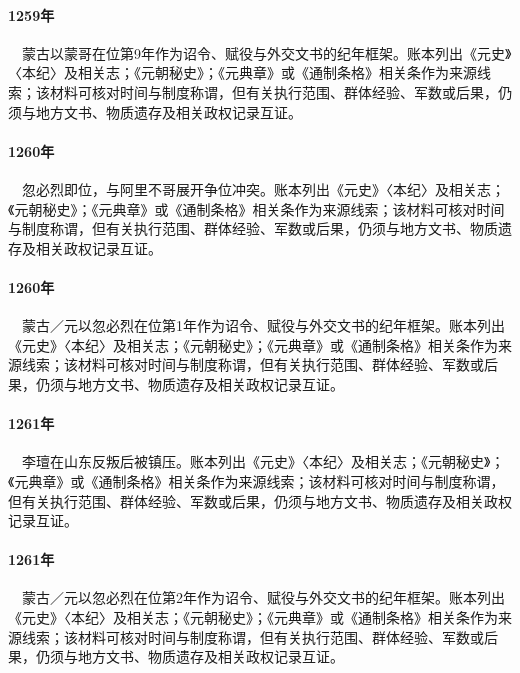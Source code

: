 \paragraph{1259年}　蒙古以蒙哥在位第9年作为诏令、赋役与外交文书的纪年框架。账本列出《元史》〈本纪〉及相关志；《元朝秘史》；《元典章》或《通制条格》相关条作为来源线索；该材料可核对时间与制度称谓，但有关执行范围、群体经验、军数或后果，仍须与地方文书、物质遗存及相关政权记录互证。

\paragraph{1260年}　忽必烈即位，与阿里不哥展开争位冲突。账本列出《元史》〈本纪〉及相关志；《元朝秘史》；《元典章》或《通制条格》相关条作为来源线索；该材料可核对时间与制度称谓，但有关执行范围、群体经验、军数或后果，仍须与地方文书、物质遗存及相关政权记录互证。

\paragraph{1260年}　蒙古／元以忽必烈在位第1年作为诏令、赋役与外交文书的纪年框架。账本列出《元史》〈本纪〉及相关志；《元朝秘史》；《元典章》或《通制条格》相关条作为来源线索；该材料可核对时间与制度称谓，但有关执行范围、群体经验、军数或后果，仍须与地方文书、物质遗存及相关政权记录互证。

\paragraph{1261年}　李璮在山东反叛后被镇压。账本列出《元史》〈本纪〉及相关志；《元朝秘史》；《元典章》或《通制条格》相关条作为来源线索；该材料可核对时间与制度称谓，但有关执行范围、群体经验、军数或后果，仍须与地方文书、物质遗存及相关政权记录互证。

\paragraph{1261年}　蒙古／元以忽必烈在位第2年作为诏令、赋役与外交文书的纪年框架。账本列出《元史》〈本纪〉及相关志；《元朝秘史》；《元典章》或《通制条格》相关条作为来源线索；该材料可核对时间与制度称谓，但有关执行范围、群体经验、军数或后果，仍须与地方文书、物质遗存及相关政权记录互证。

